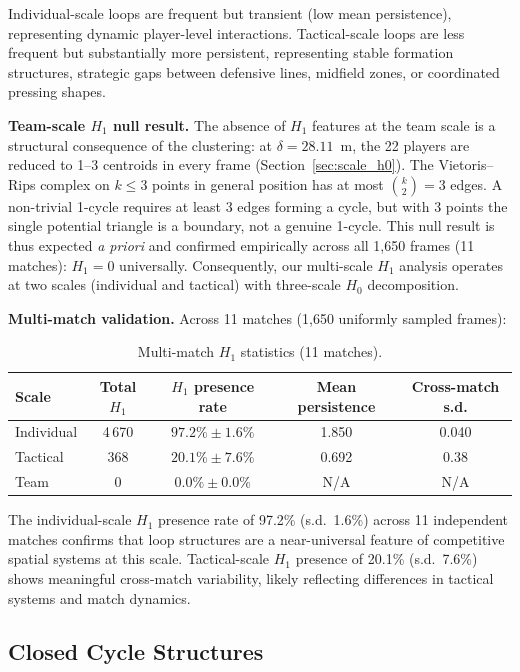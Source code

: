 Individual-scale loops are frequent but transient (low mean persistence), representing dynamic player-level interactions. Tactical-scale loops are less frequent but substantially more persistent, representing stable formation structures, strategic gaps between defensive lines, midfield zones, or coordinated pressing shapes.

\textbf{Team-scale \(H_1\) null result.} The absence of \(H_1\) features at the team scale is a structural consequence of the clustering: at \(\delta=28.11\)~m, the 22 players are reduced to 1--3 centroids in every frame (Section~\ref{sec:scale_h0}). The Vietoris--Rips complex on \(k\leq 3\) points in general position has at most \(\binom{k}{2}=3\) edges. A non-trivial 1-cycle requires at least 3 edges forming a cycle, but with 3 points the single potential triangle is a boundary, not a genuine 1-cycle. This null result is thus expected \emph{a priori} and confirmed empirically across all 1,650 frames (11 matches): \(H_1=0\) universally. Consequently, our multi-scale \(H_1\) analysis operates at two scales (individual and tactical) with three-scale \(H_0\) decomposition.

\textbf{Multi-match validation.} Across 11 matches (1,650 uniformly sampled frames):

\begin{table}[H]
  \centering
  \caption{Multi-match \(H_1\) statistics (11 matches).}
  \label{tab:h1multi}
  \begin{tabular}{@{}lcccc@{}}
      \toprule
      Scale & Total \(H_1\) & \(H_1\) presence rate & Mean persistence & Cross-match s.d. \\
      \midrule
      Individual & 4\,670 & \(97.2\%\pm1.6\%\) & 1.850 & 0.040 \\
      Tactical   & 368    & \(20.1\%\pm7.6\%\)  & 0.692 & 0.38 \\
      Team       & 0      & \(0.0\%\pm0.0\%\)    & N/A   & N/A \\
      \bottomrule
  \end{tabular}
\end{table}

The individual-scale \(H_1\) presence rate of 97.2\% (s.d.\ 1.6\%) across 11 independent matches confirms that loop structures are a near-universal feature of competitive spatial systems at this scale. Tactical-scale \(H_1\) presence of 20.1\% (s.d.\ 7.6\%) shows meaningful cross-match variability, likely reflecting differences in tactical systems and match dynamics.

\subsection{Closed Cycle Structures}
\label{sec:closed_cycles}

